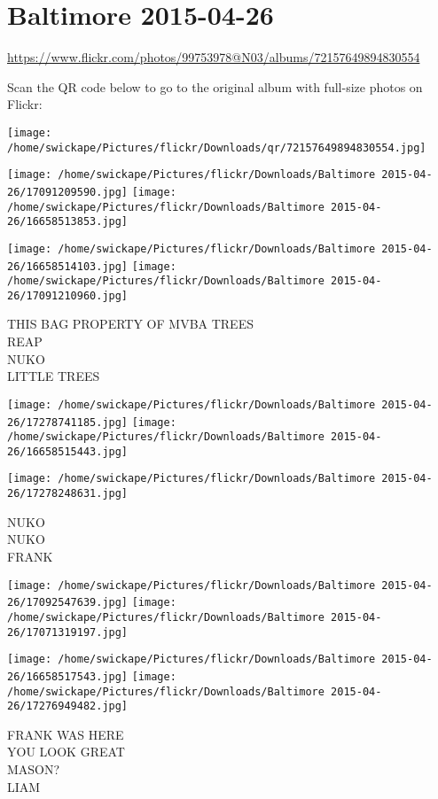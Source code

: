 \documentclass[10pt,letterpaper]{article}
\title{}
\author{}
\date{}
\begin{document}
\section*{Baltimore 2015-04-26}

\url{https://www.flickr.com/photos/99753978@N03/albums/72157649894830554}

Scan the QR code below to go to the original album with full-size photos on Flickr:

\texttt{[image: /home/swickape/Pictures/flickr/Downloads/qr/72157649894830554.jpg]}
\pagebreak

\texttt{[image: /home/swickape/Pictures/flickr/Downloads/Baltimore 2015-04-26/17091209590.jpg]}
\texttt{[image: /home/swickape/Pictures/flickr/Downloads/Baltimore 2015-04-26/16658513853.jpg]}

\texttt{[image: /home/swickape/Pictures/flickr/Downloads/Baltimore 2015-04-26/16658514103.jpg]}
\texttt{[image: /home/swickape/Pictures/flickr/Downloads/Baltimore 2015-04-26/17091210960.jpg]}

THIS BAG PROPERTY OF MVBA TREES\\
REAP\\
NUKO\\
LITTLE TREES
\pagebreak

\texttt{[image: /home/swickape/Pictures/flickr/Downloads/Baltimore 2015-04-26/17278741185.jpg]}
\texttt{[image: /home/swickape/Pictures/flickr/Downloads/Baltimore 2015-04-26/16658515443.jpg]}

\vspace{0.25in}
\texttt{[image: /home/swickape/Pictures/flickr/Downloads/Baltimore 2015-04-26/17278248631.jpg]}

NUKO\\
NUKO\\
FRANK
\pagebreak

\texttt{[image: /home/swickape/Pictures/flickr/Downloads/Baltimore 2015-04-26/17092547639.jpg]}
\texttt{[image: /home/swickape/Pictures/flickr/Downloads/Baltimore 2015-04-26/17071319197.jpg]}

\texttt{[image: /home/swickape/Pictures/flickr/Downloads/Baltimore 2015-04-26/16658517543.jpg]}
\texttt{[image: /home/swickape/Pictures/flickr/Downloads/Baltimore 2015-04-26/17276949482.jpg]}

FRANK WAS HERE\\
YOU LOOK GREAT\\
MASON?\\
LIAM
\pagebreak
\end{document}
